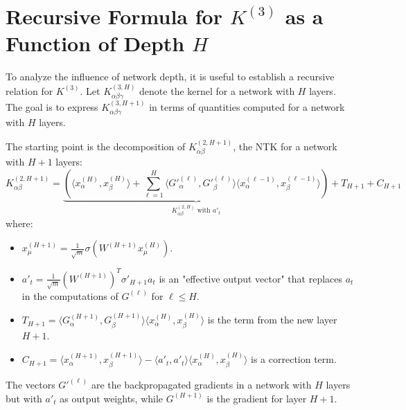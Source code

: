 \documentclass[11pt,a4paper]{article}
\theoremstyle{definition}
\begin{document}
\newpage

\section{Recursive Formula for $K^{(3)}$ as a Function of Depth $H$}

To analyze the influence of network depth, it is useful to establish a recursive relation for $K^{(3)}$. Let $K^{(3, H)}_{\alpha\beta\gamma}$ denote the kernel for a network with $H$ layers. The goal is to express $K^{(3, H+1)}_{\alpha\beta\gamma}$ in terms of quantities computed for a network with $H$ layers.

The starting point is the decomposition of $K^{(2, H+1)}_{\alpha\beta}$, the NTK for a network with $H+1$ layers:
\begin{equation}
K^{(2, H+1)}_{\alpha\beta} = \underbrace{\left( \langle x^{(H)}_\alpha, x^{(H)}_\beta \rangle + \sum_{\ell=1}^{H} \langle G'^{(\ell)}_\alpha, G'^{(\ell)}_\beta \rangle \langle x^{(\ell-1)}_\alpha, x^{(\ell-1)}_\beta \rangle \right)}_{K^{(2,H)}_{\alpha\beta} \text{ with } a'_t} + T_{H+1} + C_{H+1}
\end{equation}
where:
\begin{itemize}
    \item $x^{(H+1)}_\mu = \frac{1}{\sqrt{m}}\sigma(W^{(H+1)} x^{(H)}_\mu)$.
    \item $a'_t = \frac{1}{\sqrt{m}} (W^{(H+1)})^T \sigma'_{H+1} a_t$ is an "effective output vector" that replaces $a_t$ in the computations of $G^{(\ell)}$ for $\ell \le H$.
    \item $T_{H+1} = \langle G^{(H+1)}_\alpha, G^{(H+1)}_\beta \rangle \langle x^{(H)}_\alpha, x^{(H)}_\beta \rangle$ is the term from the new layer $H+1$.
    \item $C_{H+1} = \langle x^{(H+1)}_\alpha, x^{(H+1)}_\beta \rangle - \langle a'_t, a'_t \rangle \langle x^{(H)}_\alpha, x^{(H)}_\beta \rangle$ is a correction term.
\end{itemize}
The vectors $G'^{(\ell)}$ are the backpropagated gradients in a network with $H$ layers but with $a'_t$ as output weights, while $G^{(H+1)}$ is the gradient for layer $H+1$.
\end{document}
